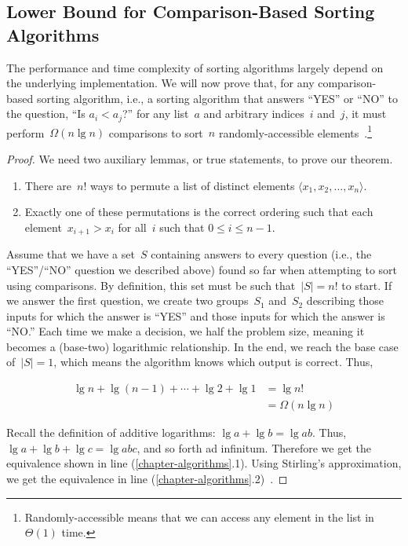 \subsection{Lower Bound for Comparison-Based Sorting Algorithms}
The performance and time complexity of sorting algorithms largely depend on the underlying implementation. 
We will now prove that, for any comparison-based sorting algorithm, i.e., a sorting algorithm that answers ``YES'' or ``NO'' to the question, ``Is $a_i < a_j$?'' for any list~$a$ and arbitrary indices~$i$ and~$j$, it must perform~$\Omega(n \lg n)$ comparisons to sort~$n$ randomly-accessible elements~.\footnote{Randomly-accessible means that we can access any element in the list in~$\Theta(1)$ time.}

\begin{proof}
We need two auxiliary lemmas, or true statements, to prove our theorem.
\begin{enumerate}[label=(\alph*)]
  \item There are~$n!$ ways to permute a list of distinct elements $\langle{x_1, x_2, \ldots, x_n}\rangle$. 
  \item Exactly one of these permutations is the correct ordering such that each element~$x_{i+1} > x_{i}$ for all~$i$ such that $0 \leq i \leq n-1$. 
\end{enumerate}

Assume that we have a set~$S$ containing answers to every question (i.e., the ``YES''/``NO'' question we described above) found so far when attempting to sort using comparisons. 
By definition, this set must be such that~$|S|=n!$ to start. 
If we answer the first question, we create two groups~$S_1$ and~$S_2$ describing those inputs for which the answer is ``YES'' and those inputs for which the answer is ``NO.'' 
Each time we make a decision, we half the problem size, meaning it becomes a (base-two) logarithmic relationship. 
In the end, we reach the base case of~$|S|=1$, which means the algorithm knows which output is correct. Thus,

\begin{align}
\lg{n} + \lg{(n-1)} + \cdots + \lg{2} + \lg{1} &= \lg{n!}\\
        &= \Omega(n \lg n)
\end{align}

Recall the definition of additive logarithms: $\lg{a} + \lg{b} = \lg{ab}$. 
Thus, $\lg{a} + \lg{b} + \lg{c} = \lg{abc}$, and so forth ad infinitum. 
Therefore we get the equivalence shown in line (\ref{chapter-algorithms}.1). 
Using Stirling's approximation, we get the equivalence in line (\ref{chapter-algorithms}.2)~.
\end{proof}
